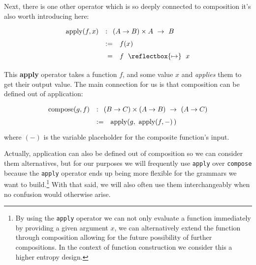 \documentclass[twoside]{article}
\newcommand{\mapsfrom}{\mathrel{\reflectbox{\ensuremath{\mapsto}}}}
\newcommand{\strong}[1]{{\bfseries #1}}
\newcommand{\apply}{\mbox{apply}}
\newcommand{\compose}{\mbox{compose}}
\begin{document}
Next, there is one other operator which is so deeply connected to composition it's also worth introducing here:
$$ \def\arraystretch{1.5}
\begin{array}{rll}
\apply(f, x)	& :  & \hspace{-1em}(A\to B)\times A\ \to\ B		\\
		& := & f(x)						\\
		& \;= & f\ \mapsfrom\ x
\end{array} $$

This \strong{apply} operator takes a function $ f $, and some value $ x $ and \emph{applies} them to get their output
value. The main connection for us is that composition can be defined out of application:
$$ \def\arraystretch{1.5}
\begin{array}{rll}
\compose(g, f)	& :  & \hspace{-1em}(B\to C)\times (A\to B)\ \to\ (A\to C)		\\
		& := & \apply(g,\ \apply(f, -)\,)
\end{array} $$
where $ (-) $ is the variable placeholder for the composite function's input.

Actually, application can also be defined out of composition so we can consider them alternatives, but for our purposes we
will frequently use \texttt{apply} over \texttt{compose} because the \texttt{apply} operator ends up being more flexible for
the grammars we want to build.\footnote{By using the \texttt{apply} operator we can not only evaluate a function immediately
by providing a given argument $ x $, we can alternatively extend the function through composition allowing for the future
possibility of further compositions. In the context of function construction we consider this a higher entropy design.}
With that said, we will also often use them interchangeably when no confusion would otherwise arise.
\end{document}
